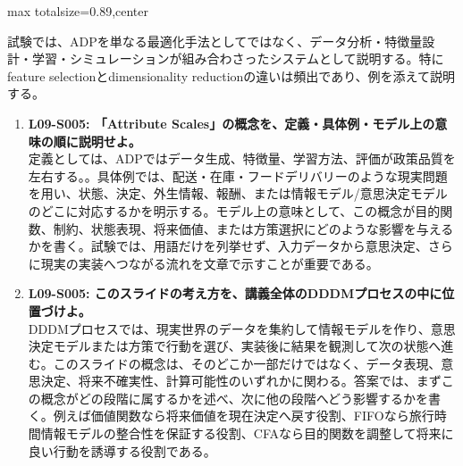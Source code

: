 \begin{minipage}[t]{0.58\textwidth}
\begin{adjustbox}{max totalsize={\textwidth}{0.89\textheight},center}
\begin{minipage}{\textwidth}
試験では、ADPを単なる最適化手法としてではなく、データ分析・特徴量設計・学習・シミュレーションが組み合わさったシステムとして説明する。特にfeature selectionとdimensionality reductionの違いは頻出であり、例を添えて説明する。\par{}\begin{enumerate}\item \textbf{L09-S005: 「Attribute Scales」の概念を、定義・具体例・モデル上の意味の順に説明せよ。}\\定義としては、ADPではデータ生成、特徴量、学習方法、評価が政策品質を左右する。。具体例では、配送・在庫・フードデリバリーのような現実問題を用い、状態、決定、外生情報、報酬、または情報モデル/意思決定モデルのどこに対応するかを明示する。モデル上の意味として、この概念が目的関数、制約、状態表現、将来価値、または方策選択にどのような影響を与えるかを書く。試験では、用語だけを列挙せず、入力データから意思決定、さらに現実の実装へつながる流れを文章で示すことが重要である。\item \textbf{L09-S005: このスライドの考え方を、講義全体のDDDMプロセスの中に位置づけよ。}\\DDDMプロセスでは、現実世界のデータを集約して情報モデルを作り、意思決定モデルまたは方策で行動を選び、実装後に結果を観測して次の状態へ進む。このスライドの概念は、そのどこか一部だけではなく、データ表現、意思決定、将来不確実性、計算可能性のいずれかに関わる。答案では、まずこの概念がどの段階に属するかを述べ、次に他の段階へどう影響するかを書く。例えば価値関数なら将来価値を現在決定へ戻す役割、FIFOなら旅行時間情報モデルの整合性を保証する役割、CFAなら目的関数を調整して将来に良い行動を誘導する役割である。\end{enumerate}
\end{minipage}
\end{adjustbox}
\end{minipage}


